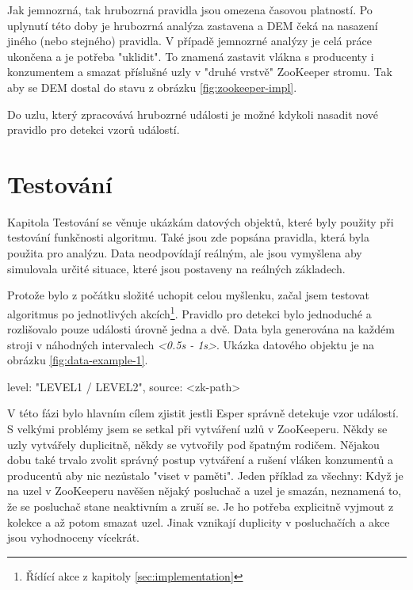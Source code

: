 \documentclass[
  digital, %
  table,   %
  nolof,     %
  nolot,     %
  oneside, %
  nocover,
  monochrome,
  12pt
]{fithesis3}
\begin{document}
Jak jemnozrná, tak hrubozrná pravidla jsou omezena časovou platností. Po uplynutí této doby je hrubozrná analýza zastavena a DEM čeká na nasazení jiného (nebo stejného) pravidla. V případě jemnozrné analýzy je celá práce ukončena a je potřeba "uklidit". To znamená zastavit vlákna s producenty i konzumentem a smazat příslušné uzly v "druhé vrstvě" ZooKeeper stromu. Tak aby se DEM dostal do stavu z obrázku \ref{fig:zookeeper-impl}.

Do uzlu, který zpracovává hrubozrné události je možné kdykoli nasadit nové pravidlo pro detekci vzorů událostí.

\section{Testování}

Kapitola Testování se věnuje ukázkám datových objektů, které byly použity při testování funkčnosti algoritmu. Také jsou zde popsána pravidla, která byla použita pro analýzu. Data neodpovídají reálným, ale jsou vymyšlena aby simulovala určité situace, které jsou postaveny na reálných základech.

Protože bylo z počátku složité uchopit celou myšlenku, začal jsem testovat algoritmus po jednotlivých akcích\footnote{Řídící akce z kapitoly \ref{sec:implementation}}. Pravidlo pro detekci bylo jednoduché a rozlišovalo pouze události úrovně jedna a dvě. Data byla generována na každém stroji v náhodných intervalech \textit{<0.5s - 1s>}. Ukázka datového objektu je na obrázku \ref{fig:data-example-1}.

\begin{center}
\begin{minipage}[H]{.5\linewidth}
	\begin{mylisting}
{
	level: "LEVEL1 / LEVEL2",
	source: <zk-path>
}
	\end{mylisting}
	\label{fig:data-example-1} 
\end{minipage}
\end{center}

V této fázi bylo hlavním cílem zjistit jestli Esper správně detekuje vzor událostí. S velkými problémy jsem se setkal při vytváření uzlů v ZooKeeperu. Někdy se uzly vytvářely duplicitně, někdy se vytvořily pod špatným rodičem. Nějakou dobu také trvalo zvolit správný postup vytváření a rušení vláken konzumentů a producentů aby nic nezůstalo "viset v paměti". Jeden příklad za všechny: Když je na uzel v ZooKeeperu navěšen nějaký posluchač a uzel je smazán, neznamená to, že se posluchač stane neaktivním a zruší se. Je ho potřeba explicitně vyjmout z kolekce a až potom smazat uzel. Jinak vznikají duplicity v posluchačích a akce jsou vyhodnoceny vícekrát.
\end{document}
